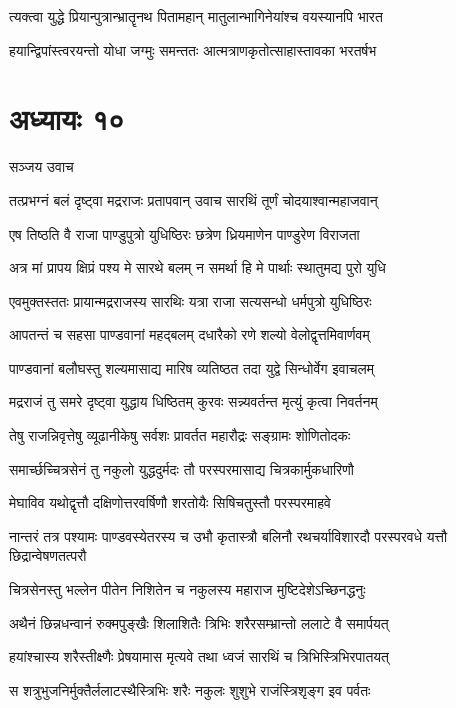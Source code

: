 \twolineshloka
{त्यक्त्वा युद्धे प्रियान्पुत्रान्भ्रातॄनथ पितामहान्}
{मातुलान्भागिनेयांश्च वयस्यानपि भारत}


\twolineshloka
{हयान्द्विपांस्त्वरयन्तो योधा जग्मुः समन्ततः}
{आत्मत्राणकृतोत्साहास्तावका भरतर्षभ}


\chapter{अध्यायः १०}
\twolineshloka
{सञ्जय उवाच}
{}


\twolineshloka
{तत्प्रभग्नं बलं दृष्ट्वा मद्रराजः प्रतापवान्}
{उवाच सारथिं तूर्णं चोदयाश्वान्महाजवान्}


\twolineshloka
{एष तिष्ठति वै राजा पाण्डुपुत्रो युधिष्ठिरः}
{छत्रेण ध्रियमाणेन पाण्डुरेण विराजता}


\twolineshloka
{अत्र मां प्रापय क्षिप्रं पश्य मे सारथे बलम्}
{न समर्था हि मे पार्थाः स्थातुमद्य पुरो युधि}


\twolineshloka
{एवमुक्तस्ततः प्रायान्मद्रराजस्य सारथिः}
{यत्रा राजा सत्यसन्धो धर्मपुत्रो युधिष्ठिरः}


\twolineshloka
{आपतन्तं च सहसा पाण्डवानां महद्बलम्}
{दधारैको रणे शल्यो वेलोद्वृत्तमिवार्णवम्}


\twolineshloka
{पाण्डवानां बलौघस्तु शल्यमासाद्य मारिष}
{व्यतिष्ठत तदा युद्वे सिन्धोर्वेग इवाचलम्}


\twolineshloka
{मद्रराजं तु समरे दृष्ट्वा युद्धाय धिष्ठितम्}
{कुरवः सन्न्यवर्तन्त मृत्युं कृत्वा निवर्तनम्}


\twolineshloka
{तेषु राजन्निवृत्तेषु व्यूढानीकेषु सर्वशः}
{प्रावर्तत महारौद्रः सङ्ग्रामः शोणितोदकः}


\twolineshloka
{समार्च्छच्चित्रसेनं तु नकुलो युद्धदुर्मदः}
{तौ परस्परमासाद्य चित्रकार्मुकधारिणौ}


\twolineshloka
{मेघाविव यथोद्वृत्तौ दक्षिणोत्तरवर्षिणौ}
{शरतोयैः सिषिचतुस्तौ परस्परमाहवे}


\threelineshloka
{नान्तरं तत्र पश्यामः पाण्डवस्येतरस्य च}
{उभौ कृतास्त्रौ बलिनौ रथचर्याविशारदौ}
{परस्परवधे यत्तौ छिद्रान्वेषणतत्परौ}


\twolineshloka
{चित्रसेनस्तु भल्लेन पीतेन निशितेन च}
{नकुलस्य महाराज मुष्टिदेशेऽच्छिनद्धनुः}


\twolineshloka
{अथैनं छिन्नधन्वानं रुक्मपुङ्खैः शिलाशितैः}
{त्रिभिः शरैरसम्भ्रान्तो ललाटे वै समार्पयत्}


\twolineshloka
{हयांश्चास्य शरैस्तीक्ष्णैः प्रेषयामास मृत्यवे}
{तथा ध्वजं सारथिं च त्रिभिस्त्रिभिरपातयत्}


\twolineshloka
{स शत्रुभुजनिर्मुक्तैर्ललाटस्थैस्त्रिभिः शरैः}
{नकुलः शुशुभे राजंस्त्रिशृङ्ग इव पर्वतः}


